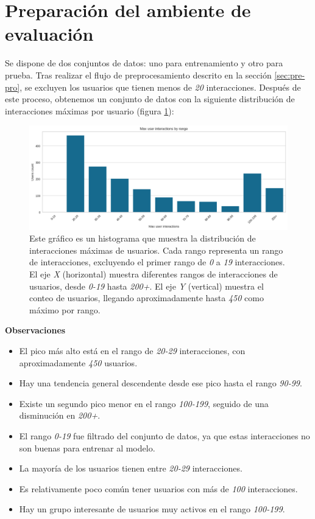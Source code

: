 \documentclass[11pt,a4paper,twoside]{thesis}
\begin{document}
\section{Preparación del ambiente de evaluación}

Se dispone de dos conjuntos de datos: uno para entrenamiento y otro para prueba. Tras realizar el flujo de preprocesamiento descrito en la sección \ref{sec:pre-pro}, se excluyen los usuarios que tienen menos de \textit{20} interacciones. Después de este proceso, obtenemos un conjunto de datos con la siguiente distribución de interacciones máximas por usuario (figura \ref{fig:user-interactions}):

\begin{figure}[h!]
	\centering
	\includegraphics[width=15cm]{./images/user_interactions.png}
	\caption{
		Este gráfico es un histograma que muestra la distribución de interacciones máximas de usuarios. Cada rango representa un rango de interacciones, excluyendo el primer rango de \textit{0} a \textit{19} interacciones. El eje \textit{X} (horizontal) muestra diferentes rangos de interacciones de usuarios, desde \textit{0-19} hasta \textit{200+}. El eje \textit{Y} (vertical) muestra el conteo de usuarios, llegando aproximadamente hasta \textit{450} como máximo por rango.
	}
	\label{fig:user-interactions}
\end{figure}

\textbf{Observaciones}
\begin{itemize}
	\item El pico más alto está en el rango de \textit{20-29} interacciones, con aproximadamente \textit{450} usuarios.
	\item Hay una tendencia general descendente desde ese pico hasta el rango \textit{90-99}.
	\item Existe un segundo pico menor en el rango \textit{100-199}, seguido de una disminución en \textit{200+}.
	\item El rango \textit{0-19} fue filtrado del conjunto de datos, ya que estas interacciones no son buenas para entrenar al modelo.
	\item La mayoría de los usuarios tienen entre \textit{20-29} interacciones.
	\item Es relativamente poco común tener usuarios con más de \textit{100} interacciones.
	\item Hay un grupo interesante de usuarios muy activos en el rango \textit{100-199}.
\end{itemize}
\end{document}
